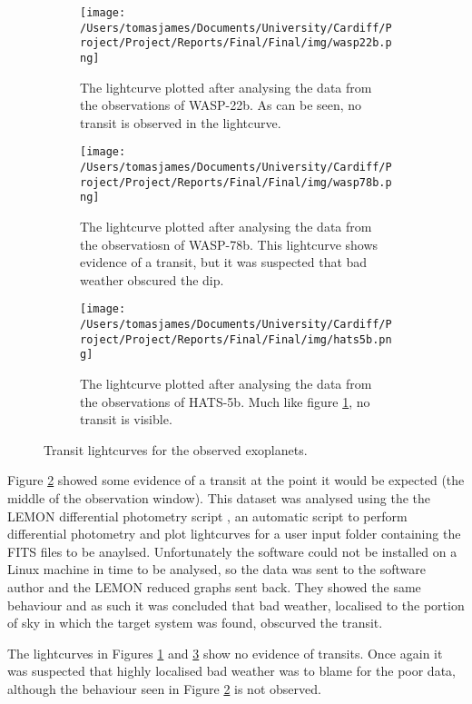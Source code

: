 \documentclass{report}
\begin{document}
\begin{figure*}[h]
\centering
    \begin{subfigure}[t]{0.31\textwidth}
    \centering
        \texttt{[image: /Users/tomasjames/Documents/University/Cardiff/Project/Project/Reports/Final/Final/img/wasp22b.png]}
    \caption{The lightcurve plotted after analysing the data from the observations of WASP-22b. As can be seen, no transit is observed in the lightcurve.} \label{wasp22b}
    \end{subfigure}
    \quad
    \begin{subfigure}[t]{0.31\textwidth}
    \centering
        \texttt{[image: /Users/tomasjames/Documents/University/Cardiff/Project/Project/Reports/Final/Final/img/wasp78b.png]}
    \caption{The lightcurve plotted after analysing the data from the observatiosn of WASP-78b. This lightcurve shows evidence of a transit, but it was suspected that bad weather obscured the dip.} \label{wasp78b}
    \end{subfigure}
    \quad
    \begin{subfigure}[t]{0.31\textwidth}
    \centering
        \texttt{[image: /Users/tomasjames/Documents/University/Cardiff/Project/Project/Reports/Final/Final/img/hats5b.png]}
    \caption{The lightcurve plotted after analysing the data from the observations of HATS-5b. Much like figure \ref{wasp22b}, no transit is visible.} \label{hats5b}
    \end{subfigure}

    \caption{Transit lightcurves for the observed exoplanets.}\label{propergood}
\end{figure*}

Figure \ref{wasp78b} showed some evidence of a transit at the point it would be expected (the middle of the observation window). This dataset was analysed using the the LEMON differential photometry script \parencite{lemon}, an automatic script to perform differential photometry and plot lightcurves for a user input folder containing the FITS files to be anaylsed. Unfortunately the software could not be installed on a Linux machine in time to be analysed, so the data was sent to the software author and the LEMON reduced graphs sent back. They showed the same behaviour and as such it was concluded that bad weather, localised to the portion of sky in which the target system was found, obscurved the transit. 

The lightcurves in Figures \ref{wasp22b} and \ref{hats5b} show no evidence of transits. Once again it was suspected that highly localised bad weather was to blame for the poor data, although the behaviour seen in Figure \ref{wasp78b} is not observed.  
\end{document}
